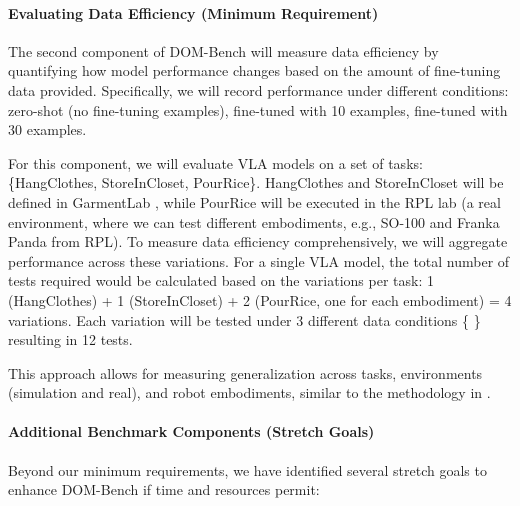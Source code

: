 \paragraph{\textbf{Evaluating Data Efficiency} (Minimum Requirement)}
The second component of DOM-Bench will measure data efficiency by quantifying how model performance changes based on the amount of fine-tuning data provided. Specifically, we will record performance under different conditions: zero-shot (no fine-tuning examples), fine-tuned with 10 examples, fine-tuned with 30 examples.

\begin{domexample}
For this component, we will evaluate VLA models on a set of tasks: \{HangClothes, StoreInCloset, PourRice\}. HangClothes and StoreInCloset will be defined in GarmentLab \cite{GarmentLab}, while PourRice will be executed in the RPL lab (a real environment, where we can test different embodiments, e.g., SO-100 and Franka Panda from RPL).
To measure data efficiency comprehensively, we will aggregate performance across these variations. For a single VLA model, the total number of tests required would be calculated based on the variations per task: 1 (HangClothes) + 1 (StoreInCloset) + 2 (PourRice, one for each embodiment) = 4 variations. Each variation will be tested under 3 different data conditions \{  \} resulting in 12 tests.
\end{domexample}

This approach allows for measuring generalization across tasks, environments (simulation and real), and robot embodiments, similar to the methodology in \cite{TransferWelle}.

\paragraph{\textbf{Additional Benchmark Components} (Stretch Goals)}
Beyond our minimum requirements, we have identified several stretch goals to enhance DOM-Bench if time and resources permit:

